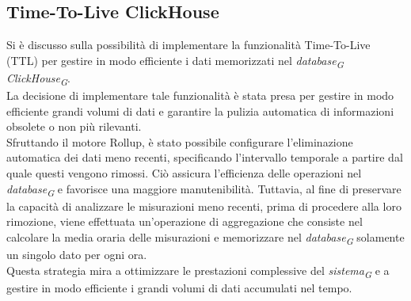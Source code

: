 \documentclass{article}
\begin{document}
    \subsection{Time-To-Live ClickHouse}
    Si è discusso sulla possibilità di implementare la funzionalità Time-To-Live (TTL) per gestire in modo efficiente i dati memorizzati nel \textit{database}\textsubscript{\textit{G}} \textit{ClickHouse}\textsubscript{\textit{G}}.\\
    La decisione di implementare tale funzionalità è stata presa per gestire in modo efficiente grandi volumi di dati e garantire la pulizia automatica di informazioni obsolete o non più rilevanti. \\
    Sfruttando il motore Rollup, è stato possibile configurare l'eliminazione automatica dei dati meno recenti, specificando l'intervallo temporale a partire dal quale questi vengono rimossi. Ciò assicura l'efficienza delle operazioni nel \textit{database}\textsubscript{\textit{G}} e favorisce una maggiore manutenibilità. Tuttavia, al fine di preservare la capacità di analizzare le misurazioni meno recenti, prima di procedere alla loro rimozione, viene effettuata un'operazione di aggregazione che consiste nel calcolare la media oraria delle misurazioni e memorizzare nel \textit{database}\textsubscript{\textit{G}} solamente un singolo dato per ogni ora.\\
    Questa strategia mira a ottimizzare le prestazioni complessive del \textit{sistema}\textsubscript{\textit{G}} e a gestire in modo efficiente i grandi volumi di dati accumulati nel tempo.
\end{document}
